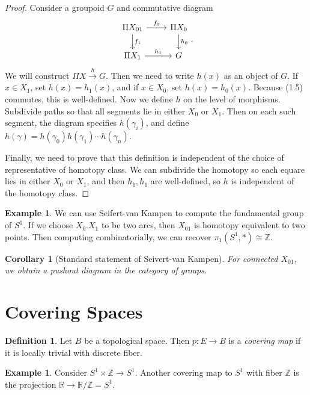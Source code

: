 \documentclass[leqno, openany]{memoir}
\newtheorem{cor}[thm]{Corollary}
\theoremstyle{definition}
\newtheorem{defn}[thm]{Definition}
\newtheorem{exm}[thm]{Example}
\theoremstyle{remark}
\theoremstyle{plain}
\theoremstyle{definition}
\theoremstyle{remark}
\newcommand{\R}{\mathbb{R}}
\newcommand{\Z}{\mathbb{Z}}
\begin{document}
\begin{proof} Consider a groupoid $G$ and commutative diagram \begin{equation}
    \begin{tikzcd} \Pi X_{01} \arrow{r}{f_0} \arrow{d}{f_1} & \Pi X_0
    \arrow{d}{h_0} \\ \Pi X_1 \arrow{r}{h_1} & G \end{tikzcd}.  \end{equation}
    We will construct $\Pi X \xrightarrow{h} G$. Then we need to write $h(x)$
    as an object of $G$. If $x \in X_1$, set $h(x) = h_1(x)$, and if $x \in
    X_0$, set $h(x) = h_0(x)$. Because (1.5) commutes, this is well-defined.
    Now we define $h$ on the level of morphisms. Subdivide paths so that all
    segments lie in either $X_0$ or $X_1$. Then on each such segment, the
    diagram specifies $h(\gamma_i)$, and define $h(\gamma) = h(\gamma_0)
    h(\gamma_1) \cdots h(\gamma_n)$.

Finally, we need to prove that this definition is independent of the choice of
representative of homotopy class. We can subdivide the homotopy so each equare
lies in either $X_0$ or $X_1$, and then $h_1, h_1$ are well-defined, so $h$ is
independent of the homotopy class.  \end{proof}

\begin{exm} We can use Seifert-van Kampen to compute the fundamental group of
    $S^1$. If we choose $X_0. X_1$ to be two arcs, then $X_{01}$ is homotopy
    equivalent to two points. Then computing combinatorially, we can recover
    $\pi_1(S^1, *) \cong \Z$.  \end{exm}

\begin{cor}[Standard statement of Seivert-van Kampen] For connected $X_{01}$,
we obtain a pushout diagram in the category of \textit{groups}.  \end{cor}

\section{Covering Spaces}%

\begin{defn} Let $B$ be a topological space. Then $p:E \to B$ is a
\textit{covering map} if it is locally trivial with discrete fiber.  \end{defn}

\begin{exm} Consider $S^1 \times \Z \to S^1$. Another covering map to $S^1$
with fiber $\Z$ is the projection $\R \to \R / \Z = S^1$.  \end{exm}
\end{document}
